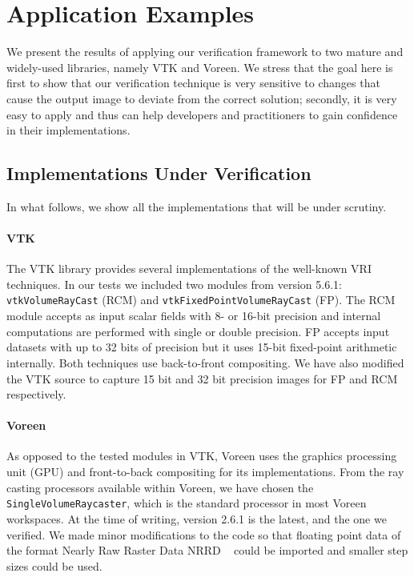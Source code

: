 \section{Application Examples}
\label{chap5:sec:results}

We present the results of applying our verification framework to two
mature and widely-used libraries, namely VTK and Voreen. We stress
that the goal here is first to show that our verification technique is
very sensitive to changes that cause the output image to deviate from
the correct solution; secondly, it is very easy to apply and thus can
help developers and practitioners to gain confidence in their
implementations.

\subsection{Implementations Under Verification}

In what follows, we show all the implementations that will be under scrutiny.

\paragraph*{VTK} 
The VTK library provides several implementations of the well-known VRI techniques. In our tests we included two modules from
version 5.6.1: \texttt{vtkVolumeRayCast} (RCM) and
\texttt{vtkFixedPointVolumeRayCast} (FP).  The RCM module
accepts as input scalar fields with 8- or 16-bit precision and internal
computations are performed with single or double precision.  FP
accepts input datasets with up to 32 bits of precision but it uses 15-bit
fixed-point arithmetic internally.  Both techniques use
back-to-front compositing. We have also modified the VTK source to
capture 15 bit and 32 bit precision images for FP and RCM
respectively.


\paragraph*{Voreen} 
As opposed to the tested modules in VTK, Voreen uses the graphics
processing unit (GPU) and front-to-back compositing for its
implementations. From the ray casting processors available within
Voreen, we have chosen the \texttt{SingleVolumeRaycaster}, which is
the standard processor in most Voreen workspaces. At the time of
writing, version 2.6.1 is the latest, and the one we verified. We made
minor modifications to the code so that floating point data of the
format Nearly Raw Raster Data NRRD ~\cite{teem} could be imported and
smaller step sizes could be used.

